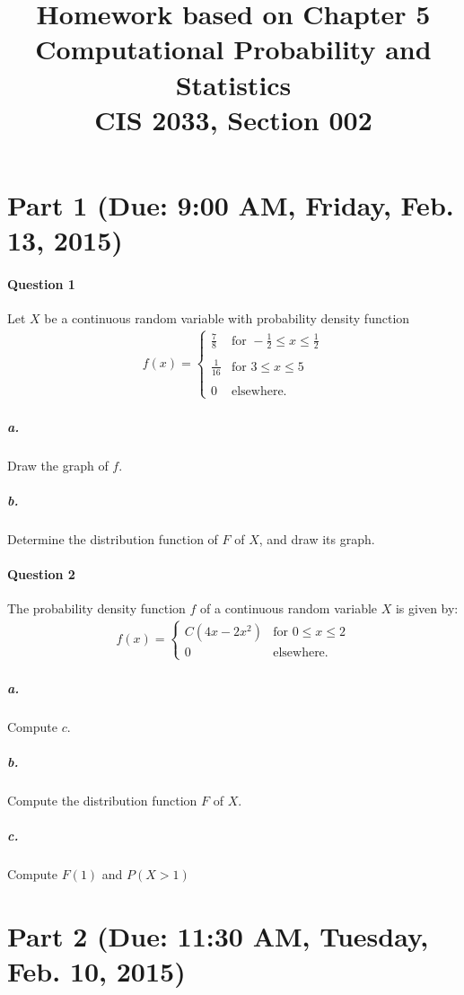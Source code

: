 \documentclass[11pt]{article} %
\title{Homework based on Chapter 5\\
Computational Probability and Statistics \\
CIS 2033, Section 002}
\author{}
\date{} %
\begin{document}
\maketitle

\section{Part 1 (Due: 9:00 AM, Friday, Feb. 13, 2015)}

\paragraph*{\bf Question 1} Let $X$ be a continuous random variable with probability density function\\
\begin{align*}
f(x) = \left\lbrace
\begin{array}{ll} 
\frac{7}{8} & \text{for } -\frac{1}{2} \leq x \leq \frac{1}{2} \\
& \\
\frac{1}{16} & \text{for } 3 \leq x \leq 5 \\ 
& \\
0 & \text{elsewhere.}
\end{array}
\right.
\end{align*}

\subparagraph*{a.} Draw the graph of $f$.
\subparagraph*{b.} Determine the distribution function of $F$ of $X$, and draw its graph. 


\paragraph*{\bf Question 2} The probability density function $f$ of a continuous random variable $X$ is given by: 
\begin{align*}
f(x) = \left\lbrace
\begin{array}{ll}
C(4x - 2x^2)  & \text{for } 0 \leq x \leq 2 \\
0 & \text{elsewhere.}
\end{array} \right.
\end{align*}

\subparagraph*{a.} Compute $c$. 
\subparagraph*{b.} Compute the distribution function $F$ of $X$.
\subparagraph*{c.} Compute $F(1)$ and $P(X>1)$
\vspace{8em}
\section{Part 2 (Due: 11:30 AM, Tuesday, Feb. 10, 2015)}
\end{document}
